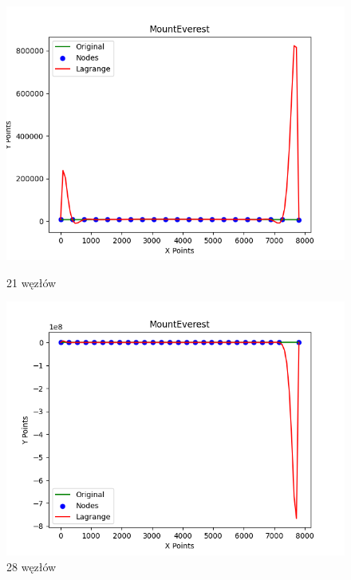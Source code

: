 \documentclass{article}
\begin{document}
\begin{figure}[H]
    \centering
    \begin{minipage}[b]{0.49\textwidth}
        \centering
        \includegraphics[width=\textwidth]{plots/MountEverest_lagrange_21.png}
        \caption{21 węzłów}
        \label{fig:21nodes}
    \end{minipage}
    \hfill
    \begin{minipage}[b]{0.49\textwidth}
        \centering
        \includegraphics[width=\textwidth]{plots/MountEverest_lagrange_28.png}
        \caption{28 węzłów}
        \label{fig:28nodes}
    \end{minipage}
\end{figure}
\end{document}
